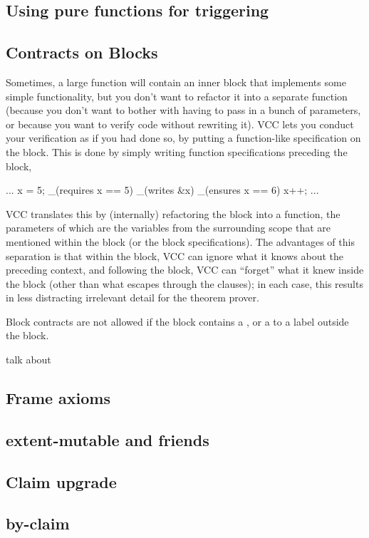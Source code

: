 \subsection{Using pure functions for triggering}

\subsection{Contracts on Blocks} 

Sometimes, a large function will contain an inner block that
implements some simple functionality, but you don't want to refactor
it into a separate function (\eg because you don't want to bother with
having to pass in a bunch of parameters, or because you want to verify
code without rewriting it). VCC lets you conduct your verification as
if you had done so, by putting a function-like specification on the
block.
This is done by simply writing function specifications
preceding the block, \eg
\begin{VCC}
...
x = 5;
_(requires x == 5)
_(writes &x)
_(ensures x == 6)
{
  x++;
}
...
\end{VCC}
VCC translates this by (internally) refactoring the block into a
function, the parameters of which are the variables from the
surrounding scope that are mentioned within the block (or the block
specifications). The advantages of this separation is that within the block,
VCC can ignore what it knows about the preceding context, and
following the block, VCC can ``forget'' what it knew inside the block
(other than what escapes through the  clauses); in each
case, this results in less distracting irrelevant detail for the
theorem prover.

Block contracts are not allowed if the block contains a ,
or a  to a label outside the block.

\itodo{} talk about 

\subsection{Frame axioms}
\subsection{extent-mutable and friends}
\subsection{Claim upgrade}
\subsection{by-claim}
